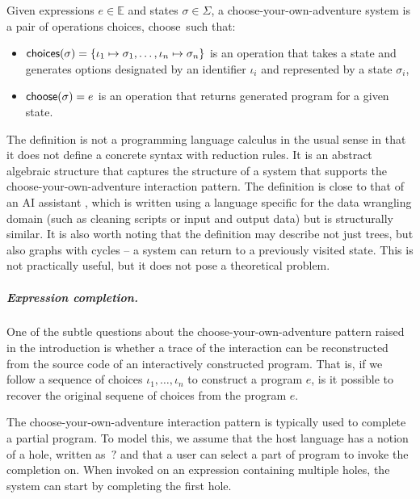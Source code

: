 \documentclass[a4paper,UKenglish,cleveref, autoref, thm-restate]{lipics-v2021}
\newcommand{\ident}[1]{\textsf{#1}}
\newcommand{\select}{\textnormal{\ident{choose}}}
\newcommand{\choices}{\textnormal{\ident{choices}}}
\begin{document}
\begin{definition}\label{def:calculus}
Given expressions $e\in \mathbb{E}$ and states $\sigma \in \Sigma$, a choose-your-own-adventure
system is a pair of operations \choices, \select\ such that:

\vspace{-0.5em}
\raggedright
\begin{itemize}
  \item $\choices(\sigma) = \{\iota_1\mapsto\sigma_1, \ldots, \iota_n\mapsto\sigma_n\}$ is
    an operation that takes a state and \\ generates options designated by an identifier $\iota_i$
    and represented by a state $\sigma_i$,
  \item $\select(\sigma) = e$ is an operation that returns generated program for a given state.
\end{itemize}
\end{definition}

The definition is not a programming language calculus in the usual sense in that it does not
define a concrete syntax with reduction rules. It is an abstract algebraic structure that captures
the structure of a system that supports the choose-your-own-adventure interaction pattern.
The definition is close to that of an AI assistant \cite{petricek-2023-aias}, which is written
using a language specific for the data wrangling domain (such as cleaning scripts or input and
output data) but is structurally similar. It is also worth noting that the definition may describe
not just trees, but also graphs with cycles -- a system can return to a previously visited state.
This is not practically useful, but it does not pose a theoretical problem.

\subparagraph{Expression completion.}
One of the subtle questions about the choose-your-own-adventure pattern raised in the introduction
is whether a trace of the interaction can be reconstructed from the source code of an interactively
constructed program. That is, if we follow a sequence of choices $\iota_1, \ldots, \iota_n$ to
construct a program $e$, is it possible to recover the original sequene of choices from the
program $e$.

The choose-your-own-adventure interaction pattern is typically used to complete a partial program.
To model this, we assume that the host language has a notion of a hole, written as~$?$
and that a user can select a part of program to invoke the completion on. When invoked on
an expression containing multiple holes, the system can start by completing the first hole.
\end{document}
